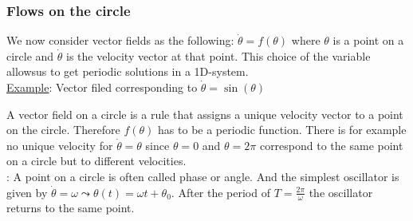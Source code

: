\subsubsection{Flows on the circle}
We now consider vector fields as the following: $\dot{\theta}=f(\theta)$ where $\theta$ is a point on a circle and $\dot{\theta}$ is the velocity vector at that point. This choice of the variable allowsus to get periodic solutions in a 1D-system.\vspace{0.2cm}\\
\underline{Example}: Vector filed corresponding to $\dot{\theta}=\sin(\theta)$
\begin{figure}[H]
	\centering
	\begin{multicols}{2}
		\begin{figure}[H]
			\centering
		\end{figure}\columnbreak
		\begin{figure}[H]
			\centering
		\end{figure}
	\end{multicols}
\end{figure}
\noindent A vector field on a circle is a rule that assigns a unique velocity vector to a point on the circle. Therefore $f(\theta)$ has to be a periodic function. There is for example no unique velocity for $\dot{\theta}=\theta$ since $\theta=0$ and $\theta=2\pi$ correspond to the same point on a circle but to different velocities.\vspace{0.5cm}\\
\textbf{\underline{}}: A point on a circle is often called phase or angle. And the simplest oscillator is given by $\dot{\theta}=\omega\leadsto\theta(t)=\omega t+\theta_0$. After the period of $T=\frac{2\pi}{\omega}$ the oscillator returns to the same point.\vspace{0.5cm}\\
